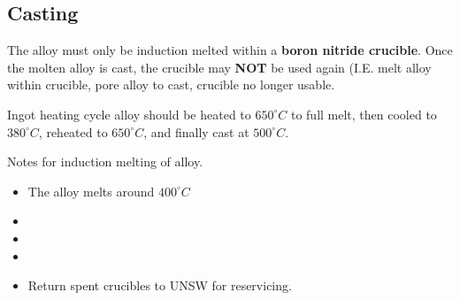 \subsection{Casting}

The \MgZnCa alloy must only be induction melted within a \textbf{boron nitride crucible}. Once the molten alloy is cast, the crucible may \textbf{NOT} be used again (I.E. melt alloy within crucible, pore alloy to cast, crucible no longer usable. 

Ingot heating cycle
\MgZnCa alloy should be heated to $650^{\circ}C$ to full melt, then cooled to $380^{\circ}C$, reheated to $650^{\circ}C$, and finally cast at $500^{\circ}C$. 

Notes for induction melting of \MgZnCa alloy.
\begin{itemize}
\item The \MgZnCa alloy melts around $400^{\circ}C$
\item 
\item 
\item
\item Return spent crucibles to UNSW for reservicing. 
\end{itemize}